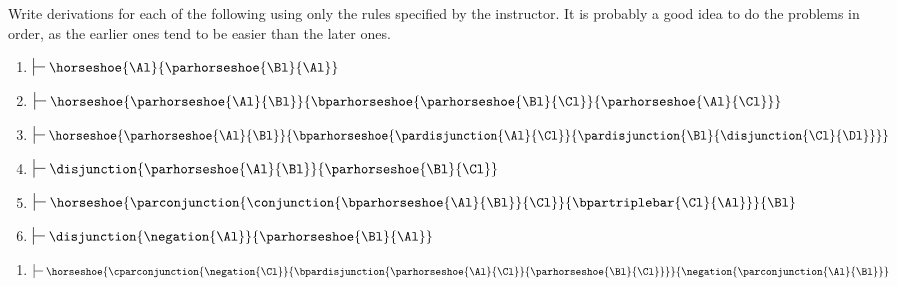 Write derivations for each of the following using only the rules specified by the instructor. 
It is probably a good idea to do the problems in order, as the earlier ones tend to be easier than the later ones. 
\begin{multicols}{2}
\begin{enumerate}
\item $\sststile{}{}\horseshoe{\Al}{\parhorseshoe{\Bl}{\Al}}$
\item $\sststile{}{}\horseshoe{\parhorseshoe{\Al}{\Bl}}{\bparhorseshoe{\parhorseshoe{\Bl}{\Cl}}{\parhorseshoe{\Al}{\Cl}}}$
\item $\sststile{}{}\horseshoe{\parhorseshoe{\Al}{\Bl}}{\bparhorseshoe{\pardisjunction{\Al}{\Cl}}{\pardisjunction{\Bl}{\disjunction{\Cl}{\Dl}}}}$
\item $\sststile{}{}\disjunction{\parhorseshoe{\Al}{\Bl}}{\parhorseshoe{\Bl}{\Cl}}$
\item $\sststile{}{}\horseshoe{\parconjunction{\conjunction{\bparhorseshoe{\Al}{\Bl}}{\Cl}}{\bpartriplebar{\Cl}{\Al}}}{\Bl}$
\item $\sststile{}{}\disjunction{\negation{\Al}}{\parhorseshoe{\Bl}{\Al}}$
\end{enumerate}
\end{multicols}
\begin{enumerate}[start=7]
\item $\sststile{}{}\horseshoe{\cparconjunction{\negation{\Cl}}{\bpardisjunction{\parhorseshoe{\Al}{\Cl}}{\parhorseshoe{\Bl}{\Cl}}}}{\negation{\parconjunction{\Al}{\Bl}}}$
\end{enumerate}

